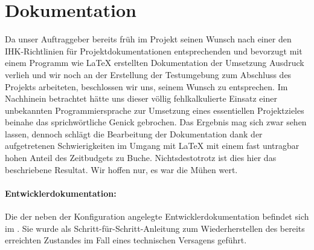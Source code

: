 \section{Dokumentation}
\label{sec:Dokumentation}
Da unser Auftraggeber bereits früh im Projekt seinen Wunsch nach einer den IHK-Richtlinien für Projektdokumentationen entsprechenden und bevorzugt mit einem Programm wie \LaTeX{} erstellten Dokumentation der Umsetzung Ausdruck verlieh und wir noch an der Erstellung der Testumgebung zum Abschluss des Projekts arbeiteten, beschlossen wir uns, seinem Wunsch zu entsprechen. Im Nachhinein betrachtet hätte uns dieser völlig fehlkalkulierte Einsatz einer unbekannten Programmiersprache zur Umsetzung eines essentiellen Projektzieles beinahe das sprichwörtliche Genick gebrochen. Das Ergebnis mag sich zwar sehen lassen, dennoch schlägt die Bearbeitung der Dokumentation dank der aufgetretenen Schwierigkeiten im Umgang mit \LaTeX{} mit einem fast untragbar hohen Anteil des Zeitbudgets zu Buche. Nichtsdestotrotz ist dies hier das beschriebene Resultat. Wir hoffen nur, es war die Mühen wert.

\paragraph*{Entwicklerdokumentation:}
Die der neben der Konfiguration angelegte Entwicklerdokumentation befindet sich im . Sie wurde als Schritt-für-Schritt-Anleitung zum Wiederherstellen des bereits erreichten Zustandes im Fall eines technischen Versagens geführt.


